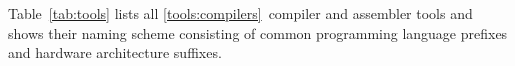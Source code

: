 \bigskip
\begin{small}
\begin{multicols}{2}
\amdaasm
\amdadism
\amdbasm
\amdbdism
\amdcasm
\amdcdism
\armaasm
\armadism
\armbasm
\armbdism
\armcasm
\armcdism
\asmprint
\avrasm
\avrdism
\avrttasm
\avrttdism
\cdamda
\cdamdb
\cdamdc
\cdarma
\cdarmb
\cdarmc
\cdarmcfpe
\cdavr
\cdavrtt
\cdcheck
\cdmabk
\cdmibl
\cdmipsa
\cdmipsb
\cdmmix
\cdopt
\cdorok
\cdppca
\cdppcb
\cdrisc
\cdrun
\cdwasm
\cppamda
\cppamdb
\cppamdc
\cpparma
\cpparmb
\cpparmc
\cpparmcfpe
\cppavr
\cppavrtt
\cppcheck
\cppcode
\cppdoc
\cppdump
\cpphtml
\cpplatex
\cppmabk
\cppmibl
\cppmipsa
\cppmipsb
\cppmmix
\cpporok
\cppppca
\cppppcb
\cppprep
\cppprint
\cpprisc
\cpprun
\cppwasm
\dbgdwarf
\doccheck
\dochtml
\doclatex
\docprint
\falamda
\falamdb
\falamdc
\falarma
\falarmb
\falarmc
\falarmcfpe
\falavr
\falavrtt
\falcheck
\falcode
\falcpp
\faldump
\falmabk
\falmibl
\falmipsa
\falmipsb
\falmmix
\falorok
\falppca
\falppcb
\falprint
\falrisc
\falrun
\falwasm
\linkbin
\linkhex
\linklib
\linkmem
\linkprg
\mabkasm
\mabkdism
\mapsearch
\miblasm
\mibldism
\mipsaasm
\mipsadism
\mipsbasm
\mipsbdism
\mmixasm
\mmixdism
\obamda
\obamdb
\obamdc
\obarma
\obarmb
\obarmc
\obarmcfpe
\obavr
\obavrtt
\obcheck
\obcode
\obcpp
\obdoc
\obdump
\obhtml
\oblatex
\obmabk
\obmibl
\obmipsa
\obmipsb
\obmmix
\oborok
\obppca
\obppcb
\obprint
\obrisc
\obrun
\obwasm
\orokasm
\orokdism
\ppcaasm
\ppcadism
\ppcbasm
\ppcbdism
\riscasm
\riscdism
\wasmasm
\wasmdism
\label{tools:all}
\end{multicols}
\end{small}

Table~\ref{tab:tools} lists all \ref*{tools:compilers}~compiler and assembler tools and shows their naming scheme consisting of common programming language prefixes and hardware architecture suffixes.

\newcommand{\compilerref}[2]{\emph{\ref{#1:#2}}}
\newcommand{\compiler}[1]{\tool{#1}\refstepcounter{compiler}}
\newcommand{\languageref}[1]{\emph{Chapter~\ref{#1}}}
\newcommand{\architectureref}[1]{\multicolumn{2}{@{}l}{\emph{See Chapter~\ref{#1}}}}
\newcommand{\backends}[1]{\compiler{cpp#1} & \compiler{fal#1} & \compiler{ob#1}}
\newcommand{\backendrefs}[1]{\compilerref{cpp}{cpp#1} & \compilerref{false}{fal#1} & \compilerref{oberon}{ob#1}}
\newcommand{\compilers}[1]{\backends{#1} & \compiler{#1asm}}
\newcommand{\compilerrefs}[1]{\backendrefs{#1} & \compilerref{assembly}{#1asm}}

